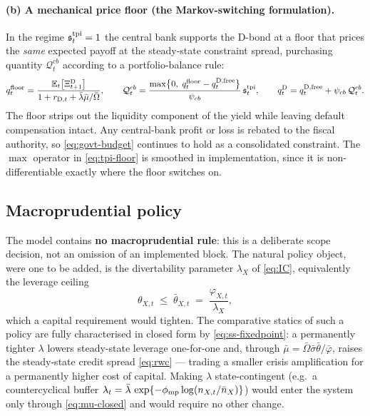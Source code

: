 \documentclass[11pt]{article}
\numberwithin{equation}{section}
\newcommand{\E}{\mathbb{E}}
\newcommand{\D}{\mathrm{D}}
\theoremstyle{definition}
\theoremstyle{plain}
\theoremstyle{remark}
\begin{document}
\paragraph{(b) A mechanical price floor (the Markov-switching formulation).} In the
regime $\mathfrak{s}^{\rm tpi}_t=1$ the central bank supports the $\D$-bond at a
floor that prices the \emph{same} expected payoff at the steady-state constraint
spread, purchasing quantity $\mathcal{Q}^{cb}_t$ according to a portfolio-balance rule:
\begin{equation}
q^{\rm floor}_t=\frac{\E_t\bigl[\Xi^{\D}_{t+1}\bigr]}{1+r_{\D,t}+\bar\lambda\bar\mu/\bar\Omega},
\qquad
\mathcal{Q}^{cb}_t=\frac{\max\bigl\{0,\;q^{\rm floor}_t-q^{\D,\rm free}_t\bigr\}}{\psi_{cb}}
\,\mathfrak{s}^{\rm tpi}_t,
\qquad
q^{\D}_t=q^{\D,\rm free}_t+\psi_{cb}\,\mathcal{Q}^{cb}_t .
\label{eq:tpi-floor}
\end{equation}
The floor strips out the liquidity component of the yield while leaving default
compensation intact. Any central-bank profit or loss is rebated to the fiscal
authority, so \eqref{eq:govt-budget} continues to hold as a consolidated constraint.
The $\max$ operator in \eqref{eq:tpi-floor} is smoothed in implementation, since it
is non-differentiable exactly where the floor switches on.

\subsection{Macroprudential policy}

The model contains \textbf{no macroprudential rule}: this is a deliberate scope
decision, not an omission of an implemented block. The natural policy object, were
one to be added, is the divertability parameter $\lambda_X$ of \eqref{eq:IC},
equivalently the leverage ceiling
\begin{equation}
\theta_{X,t}\;\le\;\bar\theta_{X,t}\;=\;\frac{\varphi_{X,t}}{\lambda_X},
\label{eq:macropru}
\end{equation}
which a capital requirement would tighten. The comparative statics of such a policy
are fully characterised in closed form by \eqref{eq:ss-fixedpoint}: a permanently
tighter $\lambda$ lowers steady-state leverage one-for-one and, through
$\bar\mu=\bar\Omega\bar\sigma\bar\theta/\bar\varphi$, raises the steady-state credit
spread \eqref{eq:rwc} --- trading a smaller crisis amplification for a permanently
higher cost of capital. Making $\lambda$ state-contingent (e.g.\ a countercyclical
buffer $\lambda_t=\bar\lambda\,\exp\{-\phi_{\rm mp}\log(n_{X,t}/\bar n_X)\}$) would
enter the system only through \eqref{eq:mu-closed} and would require no other change.
\end{document}
